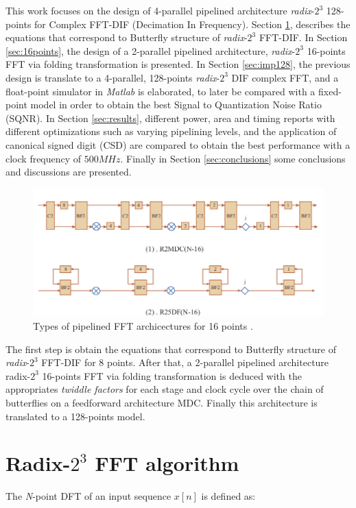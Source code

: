 \documentclass[journal,comsoc]{IEEEtran}
\begin{document}
This work focuses on the design of 4-parallel pipelined architecture \textit{radix}-$2^3$ 128-points for Complex FFT-DIF (Decimation In Frequency). Section \ref{sec:equa}, describes the equations that correspond to Butterfly structure of \textit{radix}-$2^3$ FFT-DIF. In Section \ref{sec:16points}, the design of a 2-parallel pipelined architecture, \textit{radix}-$2^3$ 16-points FFT via folding transformation is presented. In Section \ref{sec:imp128}, the previous design is translate to a 4-parallel, 128-points \textit{radix}-$2^3$ DIF complex FFT, and a float-point simulator in \textit{Matlab} is elaborated, to later be compared with a fixed-point model in order to obtain the best Signal to Quantization Noise Ratio (SQNR).
In Section \ref{sec:results}, different power, area and timing reports with different optimizations such as varying pipelining levels, and the application of canonical signed digit (CSD) are compared to obtain the best performance with a clock frequency of $500MHz$. Finally in Section \ref{sec:conclusions} some conclusions and discussions are presented.  

\begin{figure} 
	\centering
	\includegraphics[width=0.8\linewidth]{Diagramas/types_FFT.png}
	\caption{Types of pipelined FFT archicectures for 16 points \cite{type_FFT_MIT}.}
	\label{fig:types_fft}
\end{figure}

The first step is obtain the equations that correspond to Butterfly structure of \textit{radix}-$2^3$ FFT-DIF for 8 points. After that, a 2-parallel pipelined architecture radix-$2^3$ 16-points FFT via folding transformation is deduced with the appropriates \textit{twiddle factors} for each stage and clock cycle over the chain of butterflies on a feedforward architecture MDC. Finally this architecture is translated to a 128-points model. 


 
\section{Radix-$2^3$ FFT algorithm} \label{sec:equa}
The \textit{N}-point DFT of an input sequence $x[n]$ is defined as:
\end{document}
